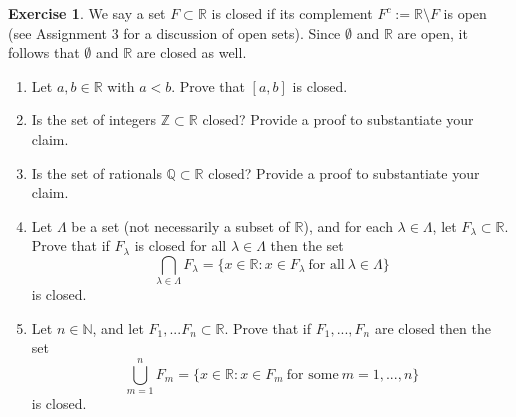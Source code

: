 \documentclass[12pt]{article}
\theoremstyle{definition}
\newtheorem{exercise}{Exercise}
\begin{document}
\thispagestyle{firstpage}

\begin{exercise}
    We say a set $F \subset \mathbb{R}$ is closed if its complement $F^{c} := \mathbb{R} \setminus F$ is open (see Assignment 3 for a discussion of open sets). Since $\emptyset$ and $\mathbb{R}$ are open, it follows that $\emptyset$ and $\mathbb{R}$ are closed as well.
    \begin{enumerate}[label=(\alph*)]
        \item Let $a,b \in \mathbb{R}$ with $a < b$. Prove that $[a, b]$ is closed.
        \item Is the set of integers $\mathbb{Z} \subset \mathbb{R}$ closed? Provide a proof to substantiate your claim.
        \item Is the set of rationals $\mathbb{Q} \subset \mathbb{R}$ closed? Provide a proof to substantiate your claim.
        \item Let $\Lambda$ be a set (not necessarily a subset of $\mathbb{R}$), and for each $\lambda \in \Lambda$, let $F_{\lambda} \subset \mathbb{R}$. Prove that if $F_{\lambda}$ is closed for all $\lambda \in \Lambda$ then the set
        \[
            \bigcap_{\lambda \in \Lambda}F_{\lambda} = \{x \in \mathbb{R} : x \in F_{\lambda} \ \text{for all} \ \lambda \in \Lambda\} 
        \]
        is closed.
        \item Let $n \in \mathbb{N}$, and let $F_1,...F_n \subset \mathbb{R}$. Prove that if $F_1,...,F_n$ are closed then the set
        \[
        \bigcup_{m = 1}^{n}F_{m} = \{x \in \mathbb{R} : x \in F_{m} \ \text{for some} \ m = 1,...,n\} 
        \]
        is closed.
    \end{enumerate}
\end{exercise}
\end{document}

